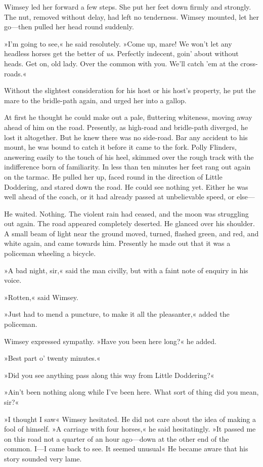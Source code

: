 Wimsey led her forward a few steps. She put her feet down firmly and strongly. The nut, removed without delay, had left no tenderness. Wimsey mounted, let her go—then pulled her head round suddenly.

»I'm going to see,« he said resolutely. »Come up, mare! We won't let any headless horses get the better of \textit{us}. Perfectly indecent, goin' about without heads. Get on, old lady. Over the common with you. We'll catch 'em at the cross-roads.«

Without the slightest consideration for his host or his host's property, he put the mare to the bridle-path again, and urged her into a gallop.

At first he thought he could make out a pale, fluttering whiteness, moving away ahead of him on the road. Presently, as high-road and bridle-path diverged, he lost it altogether. But he knew there was no side-road. Bar any accident to his mount, he was bound to catch it before it came to the fork. Polly Flinders, answering easily to the touch of his heel, skimmed over the rough track with the indifference born of familiarity. In less than ten minutes her feet rang out again on the tarmac. He pulled her up, faced round in the direction of Little Doddering, and stared down the road. He could see nothing yet. Either he was well ahead of the coach, or it had already passed at unbelievable speed, or else—

He waited. Nothing. The violent rain had ceased, and the moon was struggling out again. The road appeared completely deserted. He glanced over his shoulder. A small beam of light near the ground moved, turned, flashed green, and red, and white again, and came towards him. Presently he made out that it was a policeman wheeling a bicycle.

»A bad night, sir,« said the man civilly, but with a faint note of enquiry in his voice.

»Rotten,« said Wimsey.

»Just had to mend a puncture, to make it all the pleasanter,« added the policeman.

Wimsey expressed sympathy. »Have you been here long?« he added.

»Best part o' twenty minutes.«

»Did you see anything pass along this way from Little Doddering?«

»Ain't been nothing along while I've been here. What sort of thing did you mean, sir?«

»I thought I saw\longdash« Wimsey hesitated. He did not care about the idea of making a fool of himself. »A carriage with four horses,« he said hesitatingly. »It passed me on this road not a quarter of an hour ago—down at the other end of the common. I—I came back to see. It seemed unusual\longdash« He became aware that his story sounded very lame.

